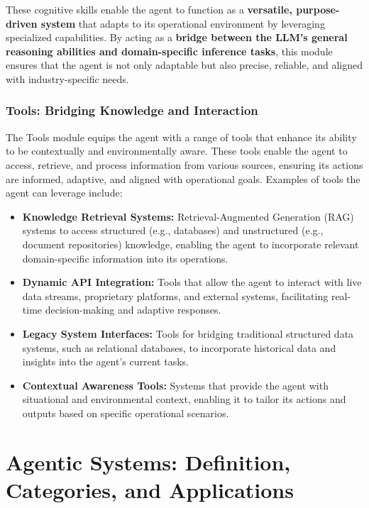 \documentclass[12pt]{article}
\begin{document}
These cognitive skills enable the agent to function as a \textbf{versatile, purpose-driven system} that adapts to its operational environment by leveraging specialized capabilities. By acting as a \textbf{bridge between the LLM’s general reasoning abilities and domain-specific inference tasks}, this module ensures that the agent is not only adaptable but also precise, reliable, and aligned with industry-specific needs.



\subsubsection{Tools: Bridging Knowledge and Interaction}
The Tools module equips the agent with a range of tools that enhance its ability to be contextually and environmentally aware. These tools enable the agent to access, retrieve, and process information from various sources, ensuring its actions are informed, adaptive, and aligned with operational goals. Examples of tools the agent can leverage include:
\begin{itemize}
    \item \textbf{Knowledge Retrieval Systems:} Retrieval-Augmented Generation (RAG) systems to access structured (e.g., databases) and unstructured (e.g., document repositories) knowledge, enabling the agent to incorporate relevant domain-specific information into its operations.
    \item \textbf{Dynamic API Integration:} Tools that allow the agent to interact with live data streams, proprietary platforms, and external systems, facilitating real-time decision-making and adaptive responses.
    \item \textbf{Legacy System Interfaces:} Tools for bridging traditional structured data systems, such as relational databases, to incorporate historical data and insights into the agent's current tasks.
    \item \textbf{Contextual Awareness Tools:} Systems that provide the agent with situational and environmental context, enabling it to tailor its actions and outputs based on specific operational scenarios.
\end{itemize}


\newpage

\section{Agentic Systems: Definition, Categories, and Applications}
\end{document}
